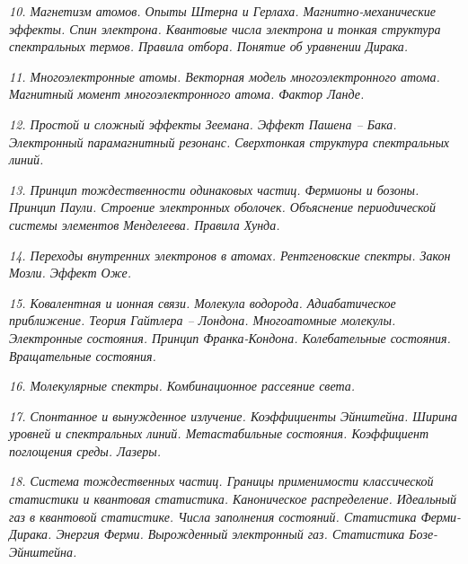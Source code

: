 \newpage %

\emph{10. Магнетизм атомов. Опыты Штерна и Герлаха. Магнитно-механические 
эффекты. Спин электрона. Квантовые числа электрона и тонкая структура 
спектральных термов. Правила отбора. Понятие об уравнении Дирака.}

\newpage %

\emph{11. Многоэлектронные атомы. Векторная модель многоэлектронного 
атома. Магнитный момент многоэлектронного атома. Фактор Ланде.}

\newpage %

\emph{12. Простой и сложный эффекты Зеемана. Эффект Пашена -- Бака. 
Электронный парамагнитный резонанс. Сверхтонкая структура спектральных 
линий.}

\newpage %

\emph{13. Принцип тождественности одинаковых частиц. Фермионы и бозоны. 
Принцип Паули. Строение электронных оболочек. Объяснение периодической 
системы элементов Менделеева. Правила Хунда.}

\newpage %

\emph{14. Переходы внутренних электронов в атомах. Рентгеновские спектры. 
Закон Мозли. Эффект Оже.}

\newpage %

\emph{15. Ковалентная и ионная связи. Молекула водорода. Адиабатическое 
приближение. Теория Гайтлера -- Лондона. Многоатомные молекулы. 
Электронные состояния. Принцип Франка-Кондона. Колебательные состояния. 
Вращательные состояния.}

\newpage %

\emph{16. Молекулярные спектры. Комбинационное рассеяние света.}

\newpage %

\emph{17. Спонтанное и вынужденное излучение. Коэффициенты Эйнштейна. 
Ширина уровней и спектральных линий. Метастабильные состояния. 
Коэффициент поглощения среды. Лазеры.}

\newpage %

\emph{18. Система тождественных частиц. Границы применимости классической 
статистики и квантовая статистика. Каноническое распределение. 
Идеальный газ в квантовой статистике. Числа заполнения состояний. 
Статистика Ферми-Дирака. Энергия Ферми. Вырожденный электронный газ. 
Статистика Бозе-Эйнштейна.}

